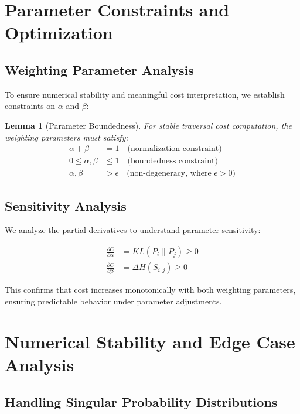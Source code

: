 \documentclass[11pt,a4paper]{article}
\newtheorem{lemma}{Lemma}
\begin{document}
\section{Parameter Constraints and Optimization}

\subsection{Weighting Parameter Analysis}

To ensure numerical stability and meaningful cost interpretation, we establish constraints on $\alpha$ and $\beta$:

\begin{lemma}[Parameter Boundedness]
For stable traversal cost computation, the weighting parameters must satisfy:
\begin{align}
\alpha + \beta &= 1 \quad \text{(normalization constraint)} \\
0 \leq \alpha, \beta &\leq 1 \quad \text{(boundedness constraint)} \\
\alpha, \beta &> \epsilon \quad \text{(non-degeneracy, where } \epsilon > 0\text{)}
\end{align}
\end{lemma}

\subsection{Sensitivity Analysis}

We analyze the partial derivatives to understand parameter sensitivity:

\begin{align}
\frac{\partial C}{\partial \alpha} &= KL(P_i \parallel P_j) \geq 0 \\
\frac{\partial C}{\partial \beta} &= \Delta H(S_{i,j}) \geq 0
\end{align}

This confirms that cost increases monotonically with both weighting parameters, ensuring predictable behavior under parameter adjustments.

\section{Numerical Stability and Edge Case Analysis}

\subsection{Handling Singular Probability Distributions}
\end{document}
